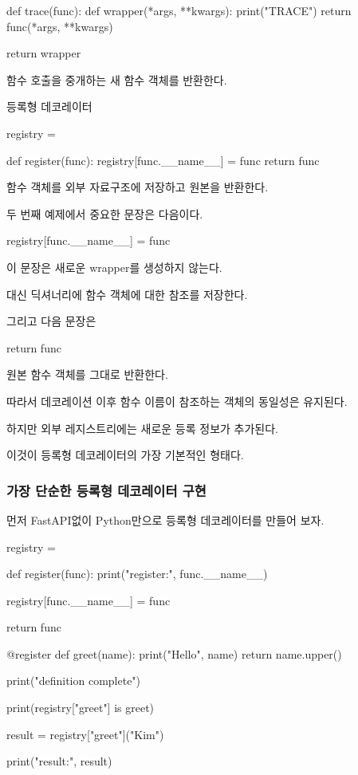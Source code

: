 \begin{dhkcode}
def trace(func):
    def wrapper(*args, **kwargs):
        print("TRACE")
        return func(*args, **kwargs)

    return wrapper
\end{dhkcode}

함수 호출을 중개하는 새 함수 객체를 반환한다.

\begin{dhknote}
\begin{dhksmry}[centered]
등록형 데코레이터
\end{dhksmry}
\end{dhknote}

\begin{dhkcode}
registry = {}

def register(func):
    registry[func.__name__] = func
    return func
\end{dhkcode}

함수 객체를 외부 자료구조에 저장하고 원본을 반환한다.

두 번째 예제에서 중요한 문장은 다음이다.

\begin{dhkcode}
registry[func.__name__] = func
\end{dhkcode}

이 문장은 새로운 wrapper를 생성하지 않는다.

대신  딕셔너리에 함수 객체에 대한 참조를 저장한다.

그리고 다음 문장은

\begin{dhkcode}
return func
\end{dhkcode}

원본 함수 객체를 그대로 반환한다.

따라서 데코레이션 이후 함수 이름이 참조하는 객체의 동일성은 유지된다.

하지만 외부 레지스트리에는 새로운 등록 정보가 추가된다.

이것이 등록형 데코레이터의 가장 기본적인 형태다.

\subsubsection{가장 단순한 등록형 데코레이터 구현}

먼저 FastAPI없이 Python만으로 등록형 데코레이터를 만들어 보자.

\begin{dhkcode}
registry = {}


def register(func):
    print("register:", func.__name__)

    registry[func.__name__] = func

    return func


@register
def greet(name):
    print("Hello", name)
    return name.upper()


print("definition complete")

print(registry["greet"] is greet)

result = registry["greet"]("Kim")

print("result:", result)
\end{dhkcode}

